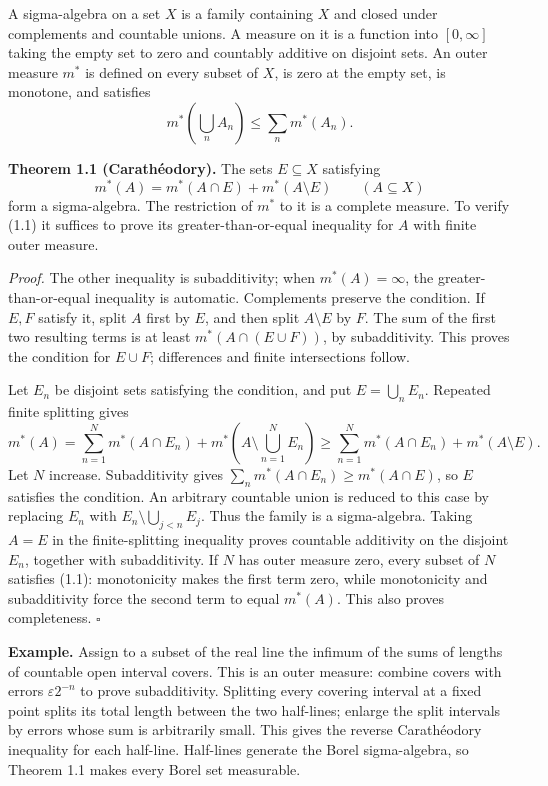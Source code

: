 \documentclass[
  english,
  11pt,
  a4paper,
]{article}
\begin{document}
A sigma-algebra on a set \(X\) is a family containing \(X\) and closed
under complements and countable unions. A measure on it is a function
into \([0,\infty]\) taking the empty set to zero and countably additive
on disjoint sets. An outer measure \(m^*\) is defined on every subset of
\(X\), is zero at the empty set, is monotone, and satisfies
\[m^*\left(\bigcup_n A_n\right)\leq\sum_n m^*(A_n).\]

\textbf{Theorem 1.1 (Carathéodory).} The sets \(E\subseteq X\)
satisfying \[m^*(A)=m^*(A\cap E)+m^*(A\setminus E)\qquad(A\subseteq X)
\tag{1.1}\] form a sigma-algebra. The restriction of \(m^*\) to it is a
complete measure. To verify (1.1) it suffices to prove its
greater-than-or-equal inequality for \(A\) with finite outer measure.

\emph{Proof.} The other inequality is subadditivity; when
\(m^*(A)=\infty\), the greater-than-or-equal inequality is automatic.
Complements preserve the condition. If \(E,F\) satisfy it, split \(A\)
first by \(E\), and then split \(A\setminus E\) by \(F\). The sum of the
first two resulting terms is at least \(m^*(A\cap(E\cup F))\), by
subadditivity. This proves the condition for \(E\cup F\); differences
and finite intersections follow.

Let \(E_n\) be disjoint sets satisfying the condition, and put
\(E=\bigcup_nE_n\). Repeated finite splitting gives
\[m^*(A)=\sum_{n=1}^N m^*(A\cap E_n)+m^*\left(A\setminus\bigcup_{n=1}^N E_n\right)
\geq\sum_{n=1}^N m^*(A\cap E_n)+m^*(A\setminus E).\] Let \(N\) increase.
Subadditivity gives \(\sum_n m^*(A\cap E_n)\geq m^*(A\cap E)\), so \(E\)
satisfies the condition. An arbitrary countable union is reduced to this
case by replacing \(E_n\) with \(E_n\setminus\bigcup_{j<n}E_j\). Thus
the family is a sigma-algebra. Taking \(A=E\) in the finite-splitting
inequality proves countable additivity on the disjoint \(E_n\), together
with subadditivity. If \(N\) has outer measure zero, every subset of
\(N\) satisfies (1.1): monotonicity makes the first term zero, while
monotonicity and subadditivity force the second term to equal
\(m^*(A)\). This also proves completeness. \(\square\)

\textbf{Example.} Assign to a subset of the real line the infimum of the
sums of lengths of countable open interval covers. This is an outer
measure: combine covers with errors \(\varepsilon2^{-n}\) to prove
subadditivity. Splitting every covering interval at a fixed point splits
its total length between the two half-lines; enlarge the split intervals
by errors whose sum is arbitrarily small. This gives the reverse
Carathéodory inequality for each half-line. Half-lines generate the
Borel sigma-algebra, so Theorem 1.1 makes every Borel set measurable.
\end{document}
